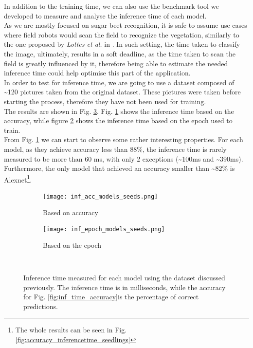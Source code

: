 In addition to the training time, we can also use the benchmark tool we developed to measure and analyse the inference time of each model.\\
As we are mostly focused on sugar beet recognition, it is safe to assume use cases where field robots would scan the field to recognize the vegetation, similarly to the one proposed by \textit{Lottes et al.} in \cite{7487720}. In such setting, the time taken to classify the image, ultimately, results in a soft deadline, as the time taken to scan the field is greatly influenced by it, therefore being able to estimate the needed inference time could help optimise this part of the application. \\
In order to test for inference time, we are going to use a dataset composed of \textasciitilde120 pictures taken from the original dataset. These pictures were taken before starting the process, therefore they have not been used for training. \\
The results are shown in Fig. \ref{fig:inf_time_epoch_seeds}. Fig. \ref{fig:inf_acc_models_seeds} shows the inference time based on the accuracy, while figure \ref{fig:inf_epoch_models_seeds} shows the inference time based on the epoch used to train. \\
From Fig. \ref{fig:inf_acc_models_seeds} we can start to observe some rather interesting properties. For each model, as they achieve accuracy less than 88\%, the inference time is rarely measured to be more than 60 ms, with only 2 exceptions (\textasciitilde100ms and \textasciitilde390ms). Furthermore, the only model that achieved an accuracy smaller than \textasciitilde82\% is Alexnet\footnote{The whole results can be seen in Fig. \ref{fig:accuracy_inferencetime_seedlings}}. %
\begin{figure}[h]
     \begin{subfigure}{0.5\textwidth}
	    \texttt{[image: inf\_acc\_models\_seeds.png]}
	    \caption{Based on accuracy}
         \label{fig:inf_acc_models_seeds}
     \end{subfigure}
     \hfill
     \begin{subfigure}{0.5\textwidth}
	    \texttt{[image: inf\_epoch\_models\_seeds.png]}
	    \caption{Based on the epoch}
        \label{fig:inf_epoch_models_seeds}
     \end{subfigure}\\
     \caption[Inference time measured for each model]{Inference time measured for each model using the dataset discussed previously. The inference time is in milliseconds, while the accuracy for Fig. \ref{fig:inf_time_accuracy}is the percentage of correct predictions.}
        \label{fig:inf_time_epoch_seeds}
\end{figure}


